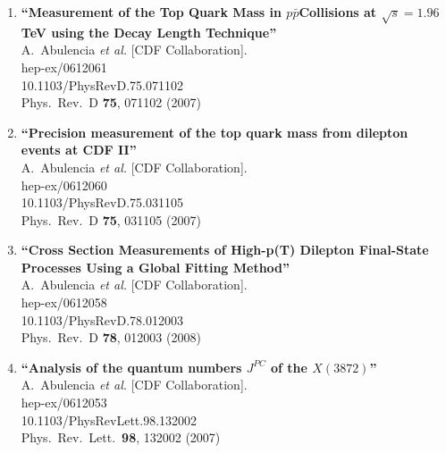 \documentclass{article}
\begin{document}
\begin{enumerate}
\item%
{\bf ``Measurement of the Top Quark Mass in $p\bar{p}$Collisions at $\sqrt{s} = 1.96$ TeV using the Decay Length Technique''}
  \\{}A.~Abulencia {\it et al.}  [CDF Collaboration].
  \\{}hep-ex/0612061
    \\{}10.1103/PhysRevD.75.071102
\\{}Phys.\ Rev.\ D {\bf 75}, 071102 (2007) %


\item%
{\bf ``Precision measurement of the top quark mass from dilepton events at CDF II''}
  \\{}A.~Abulencia {\it et al.}  [CDF Collaboration].
  \\{}hep-ex/0612060
    \\{}10.1103/PhysRevD.75.031105
\\{}Phys.\ Rev.\ D {\bf 75}, 031105 (2007) %


\item%
{\bf ``Cross Section Measurements of High-p(T) Dilepton Final-State Processes Using a Global Fitting Method''}
  \\{}A.~Abulencia {\it et al.}  [CDF Collaboration].
  \\{}hep-ex/0612058
    \\{}10.1103/PhysRevD.78.012003
\\{}Phys.\ Rev.\ D {\bf 78}, 012003 (2008) %


\item%
{\bf ``Analysis of the quantum numbers $J^{PC}$ of the $X(3872)$''}
  \\{}A.~Abulencia {\it et al.}  [CDF Collaboration].
  \\{}hep-ex/0612053
    \\{}10.1103/PhysRevLett.98.132002
\\{}Phys.\ Rev.\ Lett.\  {\bf 98}, 132002 (2007) %



\end{enumerate}
\end{document}

